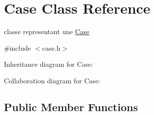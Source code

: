 \hypertarget{class_case}{}\section{Case Class Reference}
\label{class_case}


classe representant une \hyperlink{class_case}{Case}  




{\ttfamily \#include $<$case.\+h$>$}



Inheritance diagram for Case\+:


Collaboration diagram for Case\+:
\subsection*{Public Member Functions}
